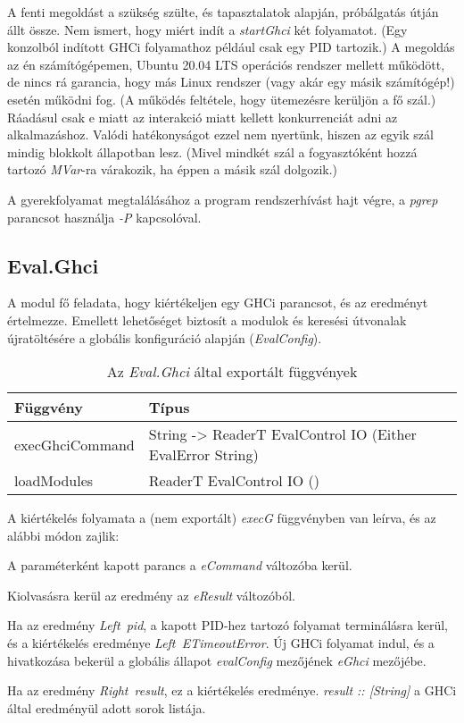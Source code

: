 A fenti megoldást a szükség szülte, és tapasztalatok alapján, próbálgatás útján állt össze. Nem ismert, hogy miért indít a \textit{startGhci} két folyamatot. (Egy konzolból indított GHCi folyamathoz például csak egy PID tartozik.) A megoldás az én számítógépemen, Ubuntu 20.04 LTS operációs rendszer mellett működött, de nincs rá garancia, hogy más Linux rendszer (vagy akár egy másik számítógép!) esetén működni fog. (A működés feltétele, hogy ütemezésre kerüljön a fő szál.) Ráadásul csak e miatt az interakció miatt kellett konkurrenciát adni az alkalmazáshoz. Valódi hatékonyságot ezzel nem nyertünk, hiszen az egyik szál mindig blokkolt állapotban lesz. (Mivel mindkét szál a fogyasztóként hozzá tartozó \textit{MVar}-ra várakozik, ha éppen a másik szál dolgozik.)

A gyerekfolyamat megtalálásához a program rendszerhívást hajt végre, a \textit{pgrep} parancsot használja \textit{-P} kapcsolóval.

\subsection{Eval.Ghci}

A modul fő feladata, hogy kiértékeljen egy GHCi parancsot, és az eredményt értelmezze. Emellett lehetőséget biztosít a modulok és keresési útvonalak újratöltésére a globális konfiguráció alapján (\textit{EvalConfig}).

\begin{table}
	\centering
	\begin{tabularx}{\textwidth}{ |X|X|}
		\hline
		Függvény & Típus \\
		\hline\hline
		execGhciCommand & String -> ReaderT EvalControl IO (Either EvalError String) \\
		\hline
		loadModules & ReaderT EvalControl IO () \\
		\hline
	\end{tabularx}
	\caption[Az \textit{Eval.Ghci} által exportált függvények]{Az \textit{Eval.Ghci} által exportált függvények}
	\label{tab:interface}
\end{table}

A kiértékelés folyamata a (nem exportált) \textit{execG} függvényben van leírva, és az alábbi módon zajlik:
\begin{compactenum}
	\item A paraméterként kapott parancs a \textit{eCommand} változóba kerül.
	\item Kiolvasásra kerül az eredmény az \textit{eResult} változóból.
	\item Ha az eredmény \textit{Left\ pid}, a kapott PID-hez tartozó folyamat terminálásra kerül, és a kiértékelés eredménye \textit{Left\ ETimeoutError}. Új GHCi folyamat indul, és a hivatkozása bekerül a globális állapot \textit{evalConfig} mezőjének \textit{eGhci} mezőjébe.
	\item Ha az eredmény \textit{Right\ result}, ez a kiértékelés eredménye. \textit{result :: [String]} a GHCi által eredményül adott sorok listája.
\end{compactenum}

